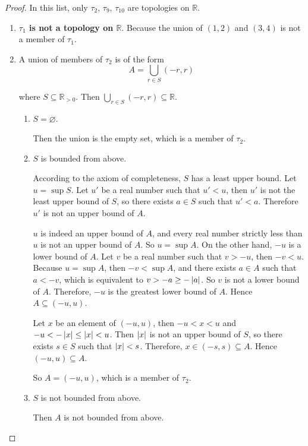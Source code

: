 \begin{proof}
	In this list, only $\tau_{2}$, $\tau_{9}$, $\tau_{10}$ are topologies on $\mathbb{R}$.

	\begin{enumerate}[label={(\roman*)}]
		\item \textbf{$\tau_{1}$ is not a topology on $\mathbb{R}$}. Because the union of $(1, 2)$ and $(3, 4)$ is not a member of $\tau_{1}$.
		\item A union of members of $\tau_{2}$ is of the form
		      \[
			      A = \bigcup_{r\in S} (-r, r)
		      \]

		      where $S\subseteq \mathbb{R}_{> 0}$. Then $\bigcup_{r\in S} (-r, r)\subseteq \mathbb{R}$.
		      \begin{enumerate}[label={\textbf{Case \arabic*.}},itemindent=1cm]
			      \item $S = \varnothing$.

			            Then the union is the empty set, which is a member of $\tau_{2}$.
			      \item $S$ is bounded from above.

			            According to the axiom of completeness, $S$ has a least upper bound. Let $u = \sup S$. Let $u'$ be a real number such that $u' < u$, then $u'$ is not the least upper bound of $S$, so there exists $a\in S$ such that $u' < a$. Therefore $u'$ is not an upper bound of $A$.

			            $u$ is indeed an upper bound of $A$, and every real number strictly less than $u$ is not an upper bound of $A$. So $u = \sup A$. On the other hand, $-u$ is a lower bound of $A$. Let $v$ be a real number such that $v > -u$, then $-v < u$. Because $u = \sup A$, then $-v < \sup A$, and there exists $a\in A$ such that $a < -v$, which is equivalent to $v > -a\geq -\left\vert{a}\right\vert$. So $v$ is not a lower bound of $A$. Therefore, $-u$ is the greatest lower bound of $A$. Hence $A \subseteq (-u, u)$.

			            Let $x$ be an element of $(-u, u)$, then $-u < x < u$ and $-u < -\left\vert{x}\right\vert\leq \left\vert{x}\right\vert < u$. Then $\left\vert{x}\right\vert$ is not an upper bound of $S$, so there exists $s\in S$ such that $\left\vert{x}\right\vert < s$. Therefore, $x\in (-s, s)\subseteq A$. Hence $(-u, u)\subseteq A$.

			            So $A = (-u, u)$, which is a member of $\tau_{2}$.
			      \item $S$ is not bounded from above.

			            Then $A$ is not bounded from above.


\end{enumerate}
\end{enumerate}
\end{proof}
